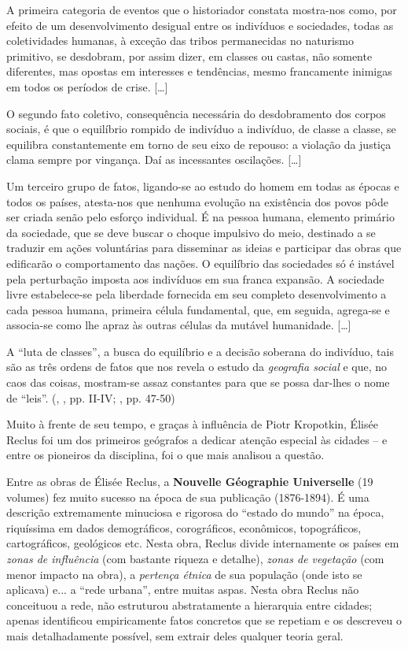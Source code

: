 \begin{citacao}
A primeira categoria de eventos que o historiador constata mostra-nos como, por efeito de um desenvolvimento desigual entre os indivíduos e sociedades, todas as coletividades humanas, à exceção das tribos permanecidas no naturismo primitivo, se desdobram, por assim dizer, em classes ou castas, não somente diferentes, mas opostas em interesses e tendências, mesmo francamente inimigas em todos os períodos de crise. [{\dots}]

O segundo fato coletivo, consequência necessária do desdobramento dos corpos sociais, é que o equilíbrio rompido de indivíduo a indivíduo, de classe a classe, se equilibra constantemente em torno de seu eixo de repouso: a violação da justiça clama sempre por vingança. Daí as incessantes oscilações. [{\dots}]

Um terceiro grupo de fatos, ligando-se ao estudo do homem em todas as épocas e todos os países, atesta-nos que nenhuma evolução na existência dos povos pôde ser criada senão pelo esforço individual. É na pessoa humana, elemento primário da sociedade, que se deve buscar o choque impulsivo do meio, destinado a se traduzir em ações voluntárias para disseminar as ideias e participar das obras que edificarão o comportamento das nações. O equilíbrio das sociedades só é instável pela perturbação imposta aos indivíduos em sua franca expansão. A sociedade livre estabelece-se pela liberdade fornecida em seu completo desenvolvimento a cada pessoa humana, primeira célula fundamental, que, em seguida, agrega-se e associa-se como lhe apraz às outras células da mutável humanidade. [{\dots}]

A ``luta de classes'', a busca do equilíbrio e a decisão soberana do indivíduo, tais são as três ordens de fatos que nos revela o estudo da \textit{geografia social }e que, no caos das coisas, mostram-se assaz constantes para que se possa dar-lhes o nome de ``leis''. (\citeauthor{RECLUS1905a}, \citeyear{RECLUS1905a}, pp. II-IV; \citeyear{reclus_renovacao_2010}, pp. 47-50)
\end{citacao}

Muito à frente de seu tempo, e graças à influência de Piotr Kropotkin, Élisée Reclus foi um dos primeiros geógrafos a dedicar atenção especial às cidades -- e entre os pioneiros da disciplina, foi o que mais analisou a questão.

Entre as obras de Élisée Reclus, a \textbf{Nouvelle Géographie Universelle }(19 volumes) fez muito sucesso na época de sua publicação (1876-1894). É uma descrição extremamente minuciosa e rigorosa do ``estado do mundo'' na época, riquíssima em dados demográficos, corográficos, econômicos, topográficos, cartográficos, geológicos etc. Nesta obra, Reclus divide internamente os países em \textit{zonas de influência }(com bastante riqueza e detalhe), \textit{zonas de vegetação }(com menor impacto na obra), a \textit{pertença étnica }de sua população (onde isto se aplicava) e... a ``rede urbana'', entre muitas aspas. Nesta obra Reclus não conceituou a rede, não estruturou abstratamente a hierarquia  entre cidades; apenas identificou empiricamente fatos concretos que se repetiam e os descreveu o mais detalhadamente possível, sem extrair deles qualquer teoria geral.

